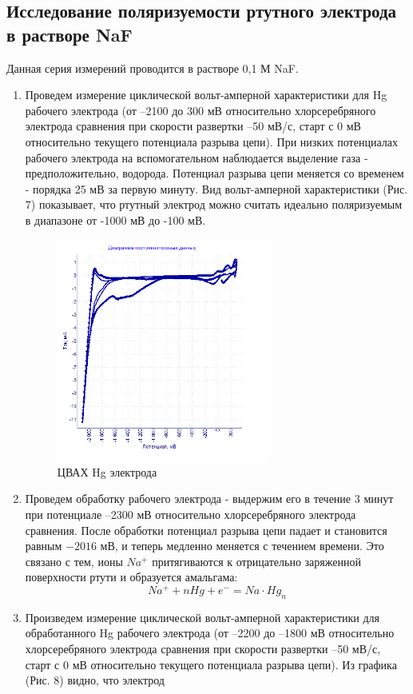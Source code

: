\documentclass[a4paper,12pt]{article}
\begin{document}
\subsection{Исследование поляризуемости ртутного электрода в растворе NaF}
Данная серия измерений проводится в растворе 0,1 М NaF.
\begin{enumerate}
    \item Проведем измерение циклической вольт-амперной характеристики для Hg
рабочего электрода (от –2100 до 300 мВ относительно хлорсеребряного электрода
сравнения при скорости развертки –50 мВ/с, старт с 0 мВ относительно текущего
потенциала разрыва цепи).
При низких потенциалах рабочего электрода на вспомогательном наблюдается
выделение газа - предположительно, водорода.
Потенциал разрыва цепи меняется со временем - порядка 25 мВ за первую
минуту.
Вид вольт-амперной характеристики (Рис. 7) показывает, что ртутный электрод
можно считать идеально поляризуемым в диапазоне от -1000 мВ до -100 мВ. 
\begin{figure}[h!]
    \centering
    \includegraphics[width=7cm]{2.1.jpg}
    \caption{ЦВАХ Hg электрода}
    \label{fig:vac}
\end{figure}
\item Проведем обработку рабочего электрода - выдержим его в течение 3 минут при потенциале –2300 мВ относительно хлорсеребряного электрода сравнения. После обработки потенциал разрыва цепи падает и становится равным $-2016$ мВ, и теперь медленно меняется с течением времени. Это связано с тем, ионы $Na^{+}$ притягиваются к отрицательно заряженной поверхности ртути и образуется амальгама:
\[
Na^+ + nHg + e^- = Na\cdot Hg_{n}
\]
\item Произведем измерение циклической вольт-амперной характеристики для обработанного Hg рабочего электрода (от –2200 до –1800 мВ относительно хлорсеребряного
электрода сравнения при скорости развертки –50 мВ/с, старт с 0 мВ относительно текущего потенциала разрыва цепи). Из графика (Рис. 8) видно, что электрод

\end{enumerate}
\end{document}
